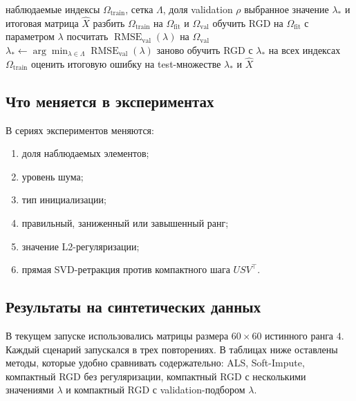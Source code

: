 \documentclass[a4paper,12pt]{article}
\begin{document}
\begin{algorithm}[H]
\caption{Validation-подбор параметра $\lambda$}
\label{alg:validation-lambda}
\begin{algorithmic}[1]
\Require наблюдаемые индексы $\Omega_{\mathrm{train}}$, сетка $\Lambda$, доля validation $\rho$
\Ensure выбранное значение $\lambda_*$ и итоговая матрица $\widehat X$
\State разбить $\Omega_{\mathrm{train}}$ на $\Omega_{\mathrm{fit}}$ и $\Omega_{\mathrm{val}}$
\For{$\lambda\in\Lambda$}
    \State обучить RGD на $\Omega_{\mathrm{fit}}$ с параметром $\lambda$
    \State посчитать $\operatorname{RMSE}_{\mathrm{val}}(\lambda)$ на $\Omega_{\mathrm{val}}$
\EndFor
\State $\lambda_*\gets \arg\min_{\lambda\in\Lambda}\operatorname{RMSE}_{\mathrm{val}}(\lambda)$
\State заново обучить RGD с $\lambda_*$ на всех индексах $\Omega_{\mathrm{train}}$
\State оценить итоговую ошибку на test-множестве
\State \Return $\lambda_*$ и $\widehat X$
\end{algorithmic}
\end{algorithm}

\subsection{Что меняется в экспериментах}

В сериях экспериментов меняются:
\begin{enumerate}[label=\arabic*.]
    \item доля наблюдаемых элементов;
    \item уровень шума;
    \item тип инициализации;
    \item правильный, заниженный или завышенный ранг;
    \item значение L2-регуляризации;
    \item прямая SVD-ретракция против компактного шага $USV^\top$.
\end{enumerate}

\subsection{Результаты на синтетических данных}

В текущем запуске использовались матрицы размера $60\times 60$ истинного ранга $4$. Каждый сценарий запускался в трех повторениях. В таблицах ниже оставлены методы, которые удобно сравнивать содержательно: ALS, Soft-Impute, компактный RGD без регуляризации, компактный RGD с несколькими значениями $\lambda$ и компактный RGD с validation-подбором $\lambda$.
\end{document}
